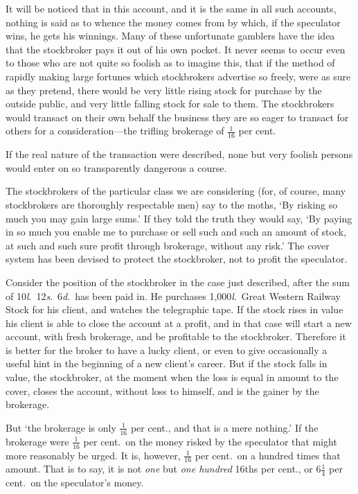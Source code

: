 \documentclass[letterpaper,12pt,oneside,openany]{memoir}
\begin{document}
It will be noticed that in this account, and it is the
same in all such accounts, nothing is said as to whence
the money comes from by which, if the speculator wins,
he gets his winnings. Many of these unfortunate
gamblers have the idea that the stockbroker pays it out
of his own pocket. It never seems to occur even to
those who are not quite so foolish as to imagine this,
that if the method of rapidly making large fortunes
which stockbrokers advertise so freely, were as sure as
they pretend, there would be very little rising stock for
purchase by the outside public, and very little falling
stock for sale to them. The stockbrokers would transact
on their own behalf the business they are so eager to
transact for others for a consideration---the trifling
brokerage of $\frac{1}{16}$ per cent.

If the real nature of the transaction were described,
none but very foolish persons would enter on so transparently
dangerous a course.

The stockbrokers of the particular class we are
considering (for, of course, many stockbrokers are
thoroughly respectable men) say to the moths, `By
risking so much you may gain large sums.' If they
told the truth they would say, `By paying in so much
you enable me to purchase or sell such and such an
amount of stock, at such and such sure profit through
brokerage, without any risk.' The cover system has
been devised to protect the stockbroker, not to profit
the speculator.

Consider the position of the stockbroker in the case
just described, after the sum of 10\textit{l}.\ 12\textit{s}.\ 6\textit{d}.\ has been
paid in. He purchases 1,000\textit{l}.\ Great Western Railway
Stock for his client, and watches the telegraphic tape.
If the stock rises in value his client is able to close the
account at a profit, and in that case will start a new
account, with fresh brokerage, and be profitable to the
stockbroker. Therefore it is better for the broker to have
a lucky client, or even to give occasionally a useful hint
in the beginning of a new client's career. But if the
stock falls in value, the stockbroker, at the moment
when the loss is equal in amount to the cover, closes
the account, without loss to himself, and is the gainer
by the brokerage.

But `the brokerage is only $\frac{1}{16}$ per cent., and that is
a mere nothing.' If the brokerage were $\frac{1}{16}$ per cent.\ on
the money risked by the speculator that might more
reasonably be urged. It is, however, $\frac{1}{16}$ per cent.\ on a
hundred times that amount. That is to say, it is not
\emph{one} but \emph{one hundred} 16ths per cent., or $6\frac{1}{4}$ per cent.\ on
the speculator's money.
\end{document}
